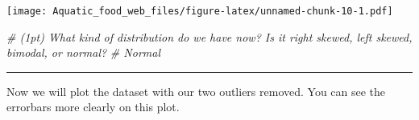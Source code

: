 \documentclass[]{article}
\newenvironment{Shaded}{\begin{snugshade}}{\end{snugshade}}
\newcommand{\KeywordTok}[1]{\textcolor[rgb]{0.13,0.29,0.53}{\textbf{#1}}}
\newcommand{\DataTypeTok}[1]{\textcolor[rgb]{0.13,0.29,0.53}{#1}}
\newcommand{\StringTok}[1]{\textcolor[rgb]{0.31,0.60,0.02}{#1}}
\newcommand{\CommentTok}[1]{\textcolor[rgb]{0.56,0.35,0.01}{\textit{#1}}}
\newcommand{\OperatorTok}[1]{\textcolor[rgb]{0.81,0.36,0.00}{\textbf{#1}}}
\newcommand{\NormalTok}[1]{#1}
\begin{document}
\begin{Shaded}
\end{Shaded}

\texttt{[image: Aquatic\_food\_web\_files/figure-latex/unnamed-chunk-10-1.pdf]}

\begin{Shaded}
\begin{Highlighting}[]
\CommentTok{# (1pt) What kind of distribution do we have now? Is it right skewed, left skewed, bimodal, or normal?}
\CommentTok{# Normal}
\end{Highlighting}
\end{Shaded}

\begin{center}\rule{0.5\linewidth}{\linethickness}\end{center}

Now we will plot the dataset with our two outliers removed. You can see
the errorbars more clearly on this plot.
\end{document}
